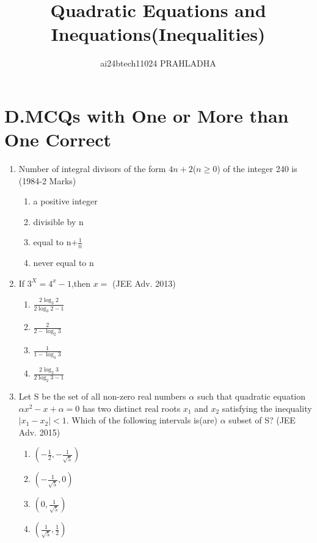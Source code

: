 \documentclass[journal,12pt,twocolumn]{IEEEtran}
\theoremstyle{remark}
\begin{document}

\vspace{3cm}
\title{Quadratic Equations and Inequations(Inequalities)}
\author{ai24btech11024 PRAHLADHA%
}
\maketitle
\newpage
\bigskip
\renewcommand{\thefigure}{\theenumi}
\renewcommand{\thetable}{\theenumi}
\section{D.MCQs with One or More than One Correct}
\begin{enumerate}
 \item Number of integral divisors of the form $4n+2$($n\geq 0$) of the integer 240 is        \hfill (1984-2 Marks)
 \begin{enumerate}
     \item a positive integer
     \item divisible by n
     \item equal to n+$\frac{1}{n}$
     \item never equal to n
 \end{enumerate}
 \item If $3^X=4^x-1$,then $x=$ \hfill (JEE Adv. 2013)
 \begin{enumerate}
     \item $\frac{2\log_3 2}{2\log_3 2-1}$
     \item $\frac{2}{2-\log_2 3}$
     \item $\frac{1}{1-\log_4 3}$
     \item $\frac{2\log_2 3}{2\log_2 3-1}$
 \end{enumerate}
 \item Let S be the set of all non-zero real numbers \(\alpha\) such that quadratic equation $\alpha x^2-x+\alpha=0$ has two distinct real roots $x_1$ and $x_2$ satisfying the inequality$|x_1-x_2|<1$. Which of the following intervals is(are) $\alpha$ subset of S? \hfill (JEE Adv. 2015)
 \begin{enumerate}
     \item $(-\frac{1}{2},-\frac{1}{\sqrt{5}})$
     \item $(-\frac{1}{\sqrt{5}},0)$
     \item $(0,\frac{1}{\sqrt{5}})$
    \item $(\frac{1}{\sqrt{5}},\frac{1}{2})$
 \end{enumerate}


\end{enumerate}
\end{document}
